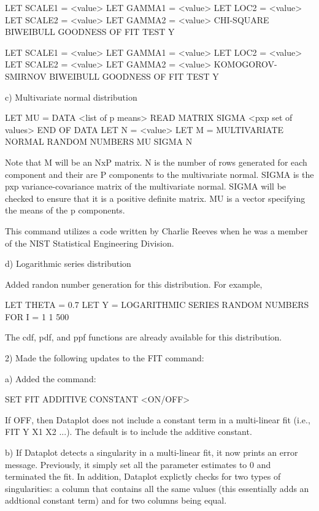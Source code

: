 {       LET SCALE1 = <value>
       LET GAMMA1 = <value>
       LET LOC2 = <value>
       LET SCALE2 = <value>
       LET GAMMA2 = <value>
       CHI-SQUARE BIWEIBULL GOODNESS OF FIT TEST Y

       LET SCALE1 = <value>
       LET GAMMA1 = <value>
       LET LOC2 = <value>
       LET SCALE2 = <value>
       LET GAMMA2 = <value>
       KOMOGOROV-SMIRNOV BIWEIBULL GOODNESS OF FIT TEST Y

    c) Multivariate normal distribution

       LET MU = DATA <list of p means>
       READ MATRIX SIGMA
          <pxp set of values>
       END OF DATA
       LET N = <value>
       LET M = MULTIVARIATE NORMAL RANDOM NUMBERS MU SIGMA N

       Note that M will be an NxP matrix.  N is the number of rows
       generated for each component and their are P components to
       the multivariate normal.  SIGMA is the pxp variance-covariance
       matrix of the multivariate normal.  SIGMA will be checked to
       ensure that it is a positive definite matrix.  MU is a vector
       specifying the means of the p components.
   
       This command utilizes a code written by Charlie Reeves when
       he was a member of the NIST Statistical Engineering Division.

    d) Logarithmic series distribution

       Added randon number generation for this distribution.  For
       example, 

            LET THETA = 0.7
            LET Y = LOGARITHMIC SERIES RANDOM NUMBERS FOR I = 1 1 500

       The cdf, pdf, and ppf functions are already available for
       this distribution.

 2) Made the following updates to the FIT command:

    a) Added the command:

         SET FIT ADDITIVE CONSTANT <ON/OFF>

       If OFF, then Dataplot does not include a constant term
       in a multi-linear fit (i.e., FIT Y X1 X2 ...).  The
       default is to include the additive constant.

    b) If Dataplot detects a singularity in a multi-linear fit,
       it now prints an error message.  Previously, it simply
       set all the parameter estimates to 0 and terminated the
       fit.  In addition, Dataplot explictly checks for two
       types of singularities: a column that contains all the same
       values (this essentially adds an addtional constant term) and
       for two columns being equal.

}
